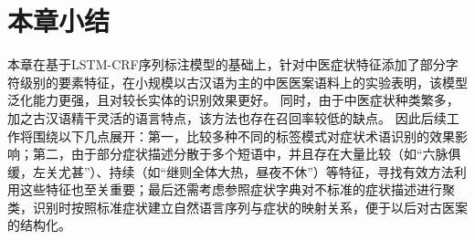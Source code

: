 \section{本章小结}

本章在基于LSTM-CRF序列标注模型的基础上，针对中医症状特征添加了部分字符级别的要素特征，在小规模以古汉语为主的中医医案语料上的实验表明，该模型泛化能力更强，且对较长实体的识别效果更好。
同时，由于中医症状种类繁多，加之古汉语精干灵活的语言特点，该方法也存在召回率较低的缺点。
因此后续工作将围绕以下几点展开：第一，比较多种不同的标签模式对症状术语识别的效果影响；第二，由于部分症状描述分散于多个短语中，并且存在大量比较（如“六脉俱缓，左关尤甚”）、持续（如“继则全体大热，昼夜不休”）等特征，寻找有效方法利用这些特征也至关重要；最后还需考虑参照症状字典对不标准的症状描述进行聚类，识别时按照标准症状建立自然语言序列与症状的映射关系，便于以后对古医案的结构化。
